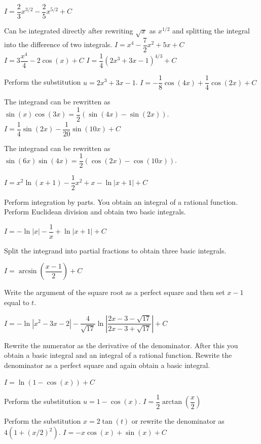 \begin{Answer}

    \Question $I = \dfrac{2}{3}x^{3/2} - \dfrac{2}{5}x^{5/2} + C$
    
     Can be integrated directly after rewriting $\sqrt{x}$ as $x^{1/2}$ and splitting the integral into the difference of two integrals. 
    \Question $I = x^4-\dfrac{7}{2}x^2+5x+C$
    \Question $I = 3\dfrac{x^4}{4}-2\cos(x)+C$
    \Question $I = \dfrac{1}{4}\left(2x^3+3x-1\right)^{4/3} + C$
    
     Perform the substitution $u=2x^3+3x-1$.
    \Question $I = -\dfrac{1}{8}\cos(4x) + \dfrac{1}{4}\cos(2x) + C$
    
     The integrand can be rewritten as $\sin(x)\cos(3x) = \dfrac{1}{2} (\sin(4x)-\sin(2x))$.
    \Question $I = \dfrac{1}{4}\sin(2x) - \dfrac{1}{20}\sin(10x) + C$ 
    
     The integrand can be rewritten as $\sin(6x)\sin(4x) = \dfrac{1}{2} (\cos(2x)-\cos(10x))$.
    
    \Question  $I =x^2 \ln(x+1) - \dfrac{1}{2}x^2 + x - \ln|x+1| + C$
   
    Perform integration by parts. You obtain an integral of a rational function. Perform Euclidean division and obtain two basic integrals.
    
    \Question $I=-\ln|x|-\dfrac{1}{x}+\ln|x+1|+C$ 
    
     Split the integrand into partial fractions to obtain three basic integrals.
    
    
    \Question $I=\arcsin \left(\dfrac{x-1}{2}\right) + C$
    
     Write the argument of the square root as a perfect square and then set $x-1$ equal to $t$.
    
    
    \Question $I= -\ln |x^2 - 3x - 2| - \dfrac{4}{\sqrt{17}} \ln \left| \dfrac{2x-3 - \sqrt{17}}{2x-3 + \sqrt{17}} \right|  + C$
    
     Rewrite the numerator as the derivative of the denominator. After this you obtain a basic integral and an integral of a rational function. Rewrite the denominator as a perfect square and again obtain a basic integral.
    
    \Question $I = \ln(1-\cos(x)) + C$
    
     Perform the substitution $u=1-\cos(x)$.
    \Question $I = \dfrac{1}{2}\arctan\left(\dfrac{x}{2}\right)$
    
     Perform the substitution $x=2\tan(t)$ or rewrite the denominator as $4(1+(x/2)^2)$. 
    \Question $I = -x\cos(x) + \sin(x) + C$
    

\end{Answer}
